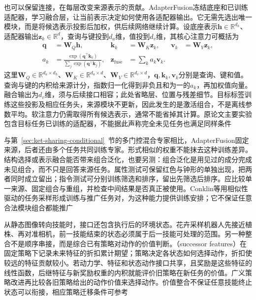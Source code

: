 也可以保留连接，在每层改变来源表示的贡献。AdapterFusion冻结底座和已训练适配器，学习融合层，让当前表示决定如何使用各适配器输出。它无需先选出唯一模块，而是将候选表示投影后加权，供后续网络继续计算。设底座表示$\bm{h}\in\mathbb{R}^{d_h}$、适配器输出$\bm{z}_k\in\mathbb{R}^{d}$，查询与键投到$d_a$维，值投到$d_v$维，其核心注意力可概括为
\begin{equation}
  \begin{aligned}
    \bm{q}&=\bm{W}_{Q}\bm{h},&
    \bm{k}_k&=\bm{W}_{K}\bm{z}_k,&
    \bm{v}_k&=\bm{W}_{V}\bm{z}_k,\\
    a_k&=\frac{\exp(\bm{q}^{\top}\bm{k}_k)}
                  {\sum_j\exp(\bm{q}^{\top}\bm{k}_j)},&
    \bm{z}_{\mathrm{fuse}}&=\sum_k a_k\bm{v}_k.
  \end{aligned}
  \label{eq:ket-integration-adapter-attention}
\end{equation}
这里$\bm{W}_Q\in\mathbb{R}^{d_a\times d_h}$、$\bm{W}_K\in\mathbb{R}^{d_a\times d}$、$\bm{W}_V\in\mathbb{R}^{d_v\times d}$，$\bm{q},\bm{k}_k,\bm{v}_k$分别是查询、键和值。查询与键的内积给来源计分，指数归一化得到非负且和为一的$a_k$，再加权值向量。融合输出为$d_v$维，须与后续接口相容；此处省略层、位置与残差细节。目标标签训练这些投影及相应任务头，来源模块不更新，因此发生的是激活组合，不是离线参数平均。软注意力仍需取得所有候选表示，通常不能省掉其计算。原论文主要实验包含目标任务已训练的适配器，不能据此声称完全未见任务也满足同样条件

与第~\ref{sec:ket-sharing-conditional}~节的多门控混合专家相比，AdapterFusion固定来源，后者还由多个任务共同训练专家。形式相似的权重不能抹去这种训练差异。结构选择或表示融合能否带来组合泛化，也要另测：组合泛化是用见过的成分完成未见组合，而不只是回答来源任务。属性测试可保留红色与钟形的单独出现，把两者同时成立留出；指令测试可分别训练筛选和排序，留出先筛选后排序。应比较单一来源、固定组合与重组，并检查中间结果是否真正被使用。Conklin等用相似性驱动的任务采样形成训练与推广任务对，为这种能力提供训练安排；它不保证任意合法模块组合都能推广

从静态图像转向技能时，接口还包含执行后的环境状态。花卉采样机器人先接近植株、再对准相机，前一技能结束的状态必须属于后一技能可处理的范围。另一种整合不是顺序串接，而是综合已有策略对动作的价值判断。（successor features）在固定策略下记录未来特征的折扣累计期望；策略决定各状态如何选择动作，折扣使较远的特征贡献较小。若动力学、特征和状态动作接口共享，且奖励是这些特征的线性函数，后继特征与新奖励权重的内积就能评价旧策略在新任务的价值。广义策略改进再比较各旧策略给出的动作价值来选择动作。价值整合不保证任意技能终止状态可以衔接，相应策略迁移条件可参考

